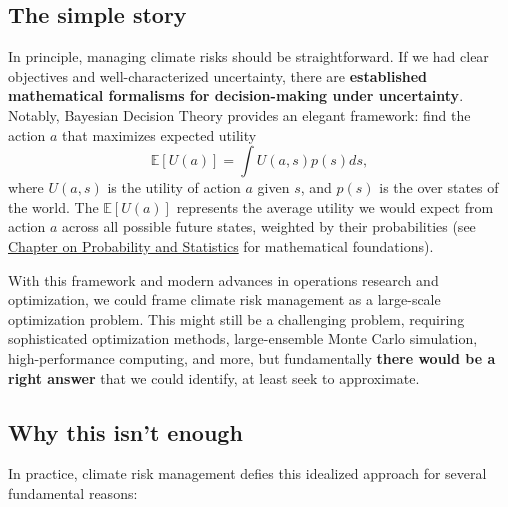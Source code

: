 \documentclass[
  letterpaper,
  DIV=11,
  numbers=noendperiod]{scrreprt}
\begin{document}

\subsection*{The simple story}\label{the-simple-story}

In principle, managing climate risks should be straightforward. If we
had clear objectives and well-characterized uncertainty, there are
\textbf{established mathematical formalisms for decision-making under
uncertainty}. Notably, Bayesian Decision Theory provides an elegant
framework: find the action \(a\) that maximizes expected utility \[
\mathbb{E}[U(a)] = \int U(a, s) p(s) ds,
\] where \(U(a, s)\) is the utility of action \(a\) given \(s\), and
\(p(s)\) is the over states of the world. The \(\mathbb{E}[U(a)]\)
represents the average utility we would expect from action \(a\) across
all possible future states, weighted by their probabilities (see
\href{./chapters/fundamentals/probability-stats.qmd}{Chapter on
Probability and Statistics} for mathematical foundations).

With this framework and modern advances in operations research and
optimization, we could frame climate risk management as a large-scale
optimization problem. This might still be a challenging problem,
requiring sophisticated optimization methods, large-ensemble Monte Carlo
simulation, high-performance computing, and more, but fundamentally
\textbf{there would be a right answer} that we could identify, at least
seek to approximate.

\subsection*{Why this isn't enough}\label{why-this-isnt-enough}

In practice, climate risk management defies this idealized approach for
several fundamental reasons:
\end{document}
